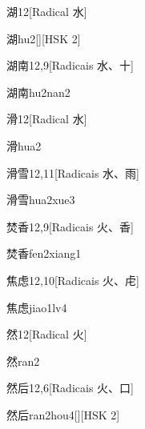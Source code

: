 \begin{entry}{湖}{12}[Radical ⽔]
  \begin{phonetics}{湖}{hu2}[][HSK 2]
  \end{phonetics}
\end{entry}

\begin{entry}{湖南}{12,9}[Radicais ⽔、⼗]
  \begin{phonetics}{湖南}{hu2nan2}
  \end{phonetics}
\end{entry}

\begin{entry}{滑}{12}[Radical ⽔]
  \begin{phonetics}{滑}{hua2}
  \end{phonetics}
\end{entry}

\begin{entry}{滑雪}{12,11}[Radicais ⽔、⾬]
  \begin{phonetics}{滑雪}{hua2xue3}
  \end{phonetics}
\end{entry}

\begin{entry}{焚香}{12,9}[Radicais ⽕、⾹]
  \begin{phonetics}{焚香}{fen2xiang1}
  \end{phonetics}
\end{entry}

\begin{entry}{焦虑}{12,10}[Radicais ⽕、⾌]
  \begin{phonetics}{焦虑}{jiao1lv4}
  \end{phonetics}
\end{entry}

\begin{entry}{然}{12}[Radical ⽕]
  \begin{phonetics}{然}{ran2}
  \end{phonetics}
\end{entry}

\begin{entry}{然后}{12,6}[Radicais ⽕、⼝]
  \begin{phonetics}{然后}{ran2hou4}[][HSK 2]
  \end{phonetics}
\end{entry}

